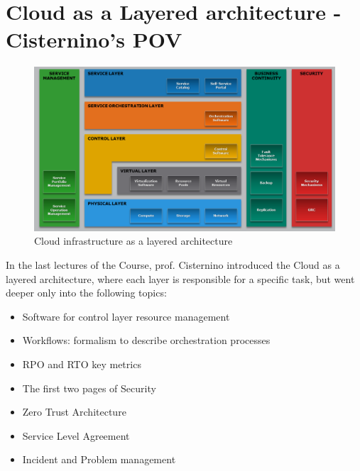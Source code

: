 \newpage
\section{Cloud as a Layered architecture - Cisternino's POV}
\begin{figure}[htbp]
   \centering
   \includegraphics{images/cloud_layers.png}
   \caption{Cloud infrastructure as a layered architecture}
   \label{fig:cloud_layers}
\end{figure}
In the last lectures of the Course, prof. Cisternino introduced the Cloud as a layered architecture, where each layer is responsible for a specific task, but went deeper only into the following topics:
\begin{itemize}
   \item Software for control layer resource management
   \item Workflows: formalism to describe orchestration processes
   \item RPO and RTO key metrics
   \item The first two pages of Security
   \item Zero Trust Architecture
   \item Service Level Agreement
   \item Incident and Problem management
\end{itemize}
\newpage

